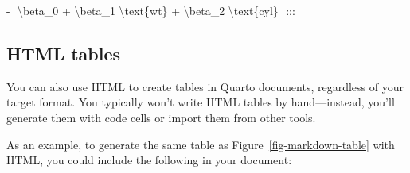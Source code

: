 \documentclass[
  letterpaper,
  DIV=11,
  numbers=noendperiod,
  oneside]{scrreprt}
\newenvironment{Shaded}{\begin{snugshade}}{\end{snugshade}}
\newcommand{\NormalTok}[1]{\textcolor[rgb]{0.00,0.23,0.31}{#1}}
\newcommand{\SpecialStringTok}[1]{\textcolor[rgb]{0.13,0.47,0.30}{#1}}
\begin{document}
\begin{tcolorbox}
\begin{Shaded}
\begin{Highlighting}[]
\SpecialStringTok{  {-} }
\NormalTok{    $$}
\NormalTok{    \textbackslash{}beta\_0 + \textbackslash{}beta\_1 \textbackslash{}text\{wt\} + \textbackslash{}beta\_2 \textbackslash{}text\{cyl\}}
\NormalTok{    $$}
\NormalTok{:::}
\end{Highlighting}
\end{Shaded}

\subsection{HTML tables}\label{html-tables}

You can also use HTML to create tables in Quarto documents, regardless
of your target format. You typically won't write HTML tables by
hand---instead, you'll generate them with code cells or import them from
other tools.

As an example, to generate the same table as
Figure~\ref{fig-markdown-table} with HTML, you could include the
following in your document:


\end{tcolorbox}
\end{document}
